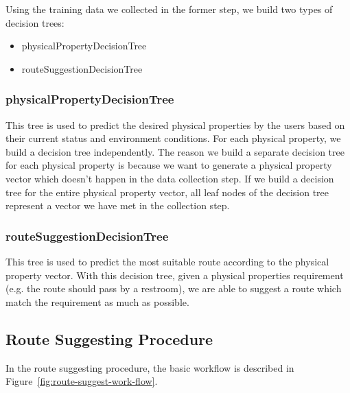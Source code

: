 \documentclass{sigchi}
\begin{document}
Using the training data we collected in the former step, we build two types of decision trees:
\begin{itemize}
\item physicalPropertyDecisionTree
\item routeSuggestionDecisionTree
\end{itemize}

\subsubsection{physicalPropertyDecisionTree}

This tree  is used to predict the desired physical properties by the users based on their current status and environment conditions. For each physical property, we build a decision tree independently. The reason we build a separate decision tree for each physical property is because we want to generate a physical property vector which doesn’t happen in the data collection step. If we build a decision tree for the entire physical property vector, all leaf nodes of the decision tree represent a vector we have met in the collection step.


\subsubsection{routeSuggestionDecisionTree}

This tree is used to predict the most suitable route according to the physical property vector. With this decision tree, given a physical properties requirement (e.g. the route should pass by a restroom), we are able to suggest a route which match the requirement as much as possible.

\subsection{Route Suggesting Procedure}
In the route suggesting procedure, the basic workflow is described in Figure~\ref{fig:route-suggest-work-flow}.
\end{document}
